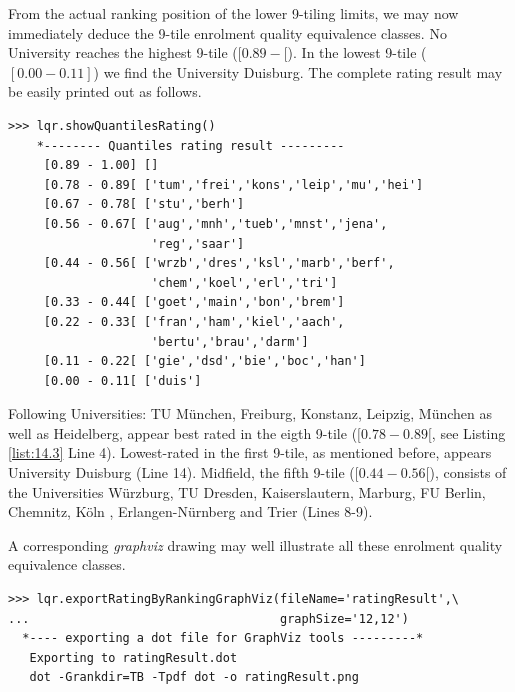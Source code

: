 From the actual ranking position of the lower 9-tiling limits, we may now immediately deduce the 9-tile enrolment quality equivalence classes. No University reaches the highest 9-tile ($[0.89 - [$). In the lowest 9-tile ($[0.00- 0.11]$) we find the University Duisburg. The complete rating result may be easily printed out as follows.

\begin{lstlisting}[caption={Computing 9-tiles of the enrolment quality scores per subject},label=list:14.3]
>>> lqr.showQuantilesRating()
    *-------- Quantiles rating result ---------
     [0.89 - 1.00] []
     [0.78 - 0.89[ ['tum','frei','kons','leip','mu','hei']
     [0.67 - 0.78[ ['stu','berh']
     [0.56 - 0.67[ ['aug','mnh','tueb','mnst','jena',
                    'reg','saar']
     [0.44 - 0.56[ ['wrzb','dres','ksl','marb','berf',
                    'chem','koel','erl','tri']
     [0.33 - 0.44[ ['goet','main','bon','brem']
     [0.22 - 0.33[ ['fran','ham','kiel','aach',
                    'bertu','brau','darm']
     [0.11 - 0.22[ ['gie','dsd','bie','boc','han']
     [0.00 - 0.11[ ['duis']
\end{lstlisting}

Following Universities: TU München, Freiburg, Konstanz, Leipzig, München as well as Heidelberg, appear best rated in the eigth 9-tile ($[0.78 - 0.89[$, see Listing \ref{list:14.3} Line 4). Lowest-rated in the first 9-tile, as mentioned before, appears University Duisburg (Line 14). Midfield, the fifth 9-tile ($[0.44 - 0.56[$), consists of the Universities Würzburg, TU Dresden, Kaiserslautern, Marburg, FU Berlin, Chemnitz, Köln , Erlangen-Nürnberg and Trier (Lines 8-9).

A corresponding \emph{graphviz} drawing may well illustrate all these enrolment quality equivalence classes.

\begin{lstlisting}
>>> lqr.exportRatingByRankingGraphViz(fileName='ratingResult',\
...                                   graphSize='12,12')
  *---- exporting a dot file for GraphViz tools ---------*
   Exporting to ratingResult.dot
   dot -Grankdir=TB -Tpdf dot -o ratingResult.png
\end{lstlisting}

